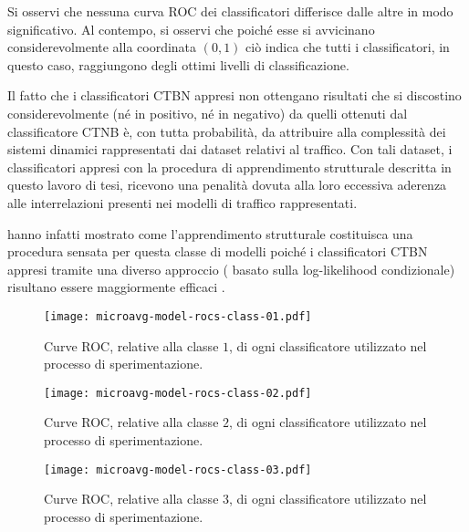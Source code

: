 Si osservi che nessuna curva \acs{ROC} dei classificatori differisce dalle altre in modo significativo. Al contempo, si osservi che poiché esse si avvicinano considerevolmente alla coordinata $(0,1)$ ciò indica che tutti i classificatori, in questo caso, raggiungono degli ottimi livelli di classificazione.

Il fatto che i classificatori \acs{CTBN} appresi non ottengano risultati che si discostino considerevolmente (né in positivo, né in negativo) da quelli ottenuti dal classificatore \acs{CTNB} è, con tutta probabilità, da attribuire alla complessità dei sistemi dinamici rappresentati dai dataset relativi al traffico. Con tali dataset, i classificatori appresi con la procedura di apprendimento strutturale descritta in questo lavoro di tesi, ricevono una penalità dovuta alla loro eccessiva aderenza alle interrelazioni presenti nei modelli di traffico rappresentati.

\citet{Codecasa2013} hanno infatti mostrato come l'apprendimento strutturale costituisca una procedura sensata per questa classe di modelli poiché i classificatori \acs{CTBN} appresi tramite una diverso approccio (\ie{} basato sulla log-likelihood condizionale) risultano essere maggiormente efficaci .

\begin{figure}[ht]
	\centering
	\texttt{[image: microavg-model-rocs-class-01.pdf]}
	\caption[Curve \acs{ROC} relative alla classe $1$]{Curve \acs{ROC}, relative alla classe $1$, di ogni classificatore utilizzato nel processo di sperimentazione.}
	\label{fig:roc-curves-class-1}
\end{figure}

\begin{figure}
	\centering
	\texttt{[image: microavg-model-rocs-class-02.pdf]}
	\caption[Curve \acs{ROC} relative alla classe $2$]{Curve \acs{ROC}, relative alla classe $2$, di ogni classificatore utilizzato nel processo di sperimentazione.}
	\label{fig:roc-curves-class-2}
\end{figure}

\begin{figure}
	\centering
	\texttt{[image: microavg-model-rocs-class-03.pdf]}
	\caption[Curve \acs{ROC} relative alla classe $3$]{Curve \acs{ROC}, relative alla classe $3$, di ogni classificatore utilizzato nel processo di sperimentazione.}
	\label{fig:roc-curves-class-3}
\end{figure}

